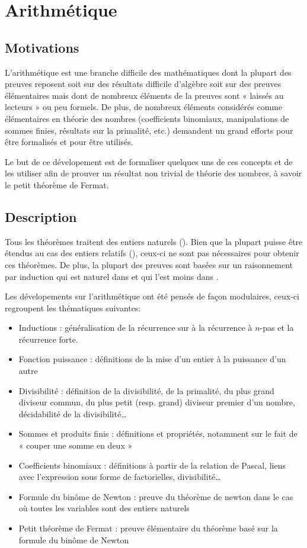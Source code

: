 \section{Arithmétique}

\subsection{Motivations}

L'arithmétique est une branche difficile des mathématiques dont la plupart des preuves reposent soit sur des résultats difficile d'algèbre soit sur des preuves élémentaires mais dont de nombreux éléments de la preuves sont « laissés au lecteurs » ou peu formels. De plus, de nombreux éléments considérés comme élémentaires en théorie des nombres (coefficients binomiaux, manipulations de sommes finies, résultats sur la primalité, etc.) demandent un grand efforts pour être formalisés et pour être utilisés.

Le but de ce dévelopement est de formaliser quelques uns de ces concepts et de les utiliser afin de prouver un résultat non trivial de théorie des nombres, à savoir le petit théorème de Fermat.

\subsection{Description}

Tous les théorèmes traitent des entiers naturels (). Bien que la plupart puisse être étendus au cas des entiers relatifs (), ceux-ci ne sont pas nécessaires pour obtenir ces théorèmes. De plus, la plupart des preuves sont basées sur un raisonnement par induction qui est naturel dans  et qui l'est moins dans .

Les dévelopements sur l'arithmétique ont été pensés de façon modulaires, ceux-ci regroupent les thématiques suivantes:
\begin{itemize}
 \item Inductions : généralisation de la récurrence sur  à la récurrence à $n$-pas et la récurrence forte.
 \item Fonction puissance : définitions de la mise d'un entier à la puissance d'un autre
 \item Divisibilité : définition de la divisibilité, de la primalité, du plus grand diviseur commun, du plus petit (resp. grand) diviseur premier d'un nombre, décidabilité de la divisibilité\ldots
 \item Sommes et produits finis : définitions et propriétés, notamment sur le fait de « couper une somme en deux »
 \item Coefficients binomiaux : définitions à partir de la relation de Pascal, liens avec l'expression sous forme de factorielles, divisibilité\ldots
 \item Formule du binôme de Newton : preuve du théorème de newton dans le cas où toutes les variables sont des entiers naturels
 \item Petit théorème de Fermat : preuve élémentaire du théorème basé sur la formule du binôme de Newton
\end{itemize}


